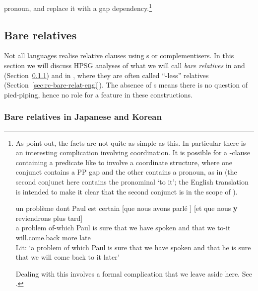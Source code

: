 \documentclass[output=paper
                ,modfonts
                ,nonflat
	        ,collection
	        ,collectionchapter
	        ,collectiontoclongg
 	        ,biblatex
                ,babelshorthands
                ,newtxmath
                ,draftmode
                ,colorlinks, citecolor=brown
]{./langsci/langscibook}
\begin{document}
pronoun, and replace it with a gap dependency.\footnote{As \cite{AbeilleGodard07} point
  out, the facts are not quite as simple as this. In particular there is an interesting
  complication involving coordination. It is possible for a -clause containing a
  predicate like  to involve a coordinate structure, where one conjunct
  contains a PP gap and the other contains a pronoun, as in  (the
  second conjunct here contains the pronominal  `to it'; the English translation is
  intended to make it clear that the second conjunct is in the scope of ).
  \begin{exe}\ex\label{x:rc-80}\gll
    un problème dont         Paul est certain [que nous avons parlé  \trace] [et que nous \textbf{y} reviendrons plus tard]\\
    a     problem   of-which Paul is   sure      \hspaceThis{[}that we have 
    spoken  \hspaceThis{[}and that we to-it will.come.back more late\\
    \glt Lit: `a problem of which Paul is sure that we have  spoken and that
    he is sure that we will come back to it later'
  \end{exe}
  Dealing with this
  involves a formal complication that we leave aside here. See \cite{AbeilleGodard07}.}


\subsection{Bare relatives}
\label{sec:rc-bare-relatives}

Not all languages realise relative clauses using s or complementisers. In this section we
will discuss HPSG analyses of what we will call \emph{bare relatives} in  and 
(Section~\ref{sec:rc-bare-relat-japan}) and in , where they are often called
``-less'' relatives (Section~\ref{sec:rc-bare-relat-engl}).  The absence of s means there is no question of pied-piping, hence no role for a 
feature in these constructions.

\subsubsection{Bare relatives in Japanese and Korean}
\label{sec:rc-bare-relat-japan}
\end{document}
